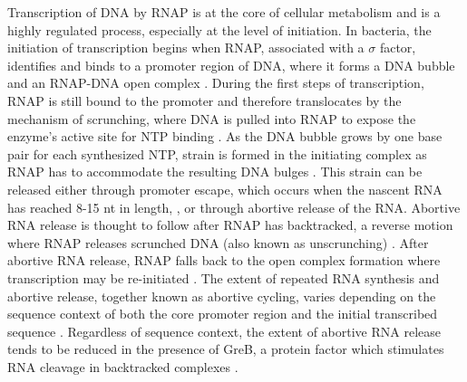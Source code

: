 %
Transcription of DNA by RNAP is at the core of cellular metabolism and is a
highly regulated process, especially at the level of initiation. In bacteria,
the initiation of transcription begins when RNAP, associated with a $\sigma$
factor, identifies and binds to a promoter region of DNA, where it forms a DNA
bubble and an RNAP-DNA open complex \cite{saecker_mechanism_2011}. During the
first steps of transcription, RNAP is still bound to the promoter and
therefore translocates by the mechanism of scrunching, where DNA is pulled
into RNAP to expose the enzyme's active site for NTP binding
\cite{revyakin_abortive_2006, kapanidis_initial_2006}. As the DNA bubble grows
by one base pair for each synthesized NTP, strain is formed in the initiating
complex as RNAP has to accommodate the resulting DNA bulges
\cite{straney_stressed_1987, kapanidis_initial_2006,
winkelman_crosslink_2015}. This strain can be released either through promoter
escape, which occurs when the nascent RNA has
reached 8-15 nt in length, \cite{carpousis_cycling_1980,
hsu_vitro_2003, tang_real-time_2009, hsu_initial_2006}, or through abortive
release of the RNA. Abortive RNA release is thought to follow after RNAP has
backtracked, a reverse motion where RNAP releases scrunched
DNA (also known as unscrunching) \cite{hsu_escherichia_1995,
feng_grea-induced_1994, hsu_initial_2006}. After abortive RNA release, RNAP
falls back to the open complex formation where transcription may be
re-initiated \cite{carpousis_cycling_1980}. The extent of repeated RNA
synthesis and abortive release, together known as abortive cycling, varies
depending on the sequence context of both the core promoter region and the
initial transcribed sequence \cite{hsu_initial_2006, hsu_promoter_2002,
vo_vitro_2003, skancke_sequence-dependent_2015}. Regardless of sequence
context, the extent of abortive RNA release tends to be reduced in the
presence of GreB, a protein factor which stimulates RNA cleavage in
backtracked complexes \cite{hsu_initial_2006}.

